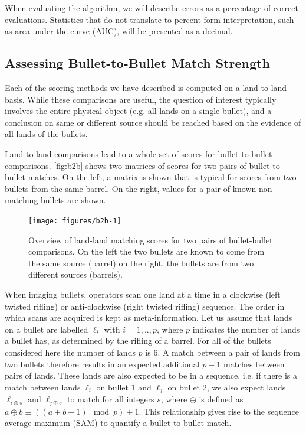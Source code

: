 \documentclass[doubleblind]{elsarticle}\usepackage[]{graphicx}\usepackage[]{color}
\newenvironment{knitrout}{}{} %
\begin{document}
When evaluating the \citet{aoas2} algorithm, we will describe errors as a percentage of correct evaluations. Statistics that do not translate to percent-form interpretation, such as area under the curve (AUC), will be presented as a decimal. 

\subsection{Assessing Bullet-to-Bullet Match Strength}

Each of the scoring methods we have described is computed on a land-to-land basis. While these comparisons are useful, the question of interest typically involves the entire physical object (e.g. all lands on a single bullet), and a conclusion on same or different source should be reached based on the evidence of all lands of the bullets.



Land-to-land comparisons lead to a whole set of scores for bullet-to-bullet comparisons. \autoref{fig:b2b} shows two matrices of scores for two pairs of bullet-to-bullet matches. On the left, a matrix is shown that is typical for scores from two bullets from the same barrel. On the right, values for a pair of known non-matching bullets are shown.


\begin{knitrout}
\color{fgcolor}\begin{figure}

{\centering \texttt{[image: figures/b2b-1]} 

}

\caption[Overview of land-land matching scores for two pairs of bullet-bullet comparisons]{Overview of land-land matching scores for two pairs of bullet-bullet comparisons. On the left the two bullets are known to come from the same source (barrel) on the right, the bullets are from two different sources (barrels).}\label{fig:b2b}
\end{figure}


\end{knitrout}

When imaging bullets, operators scan one land at a time in a clockwise (left twisted rifling) or anti-clockwise (right twisted rifling) sequence. The order in which scans are acquired is kept as meta-information. Let us assume that lands on a bullet are labelled $\ell_i$ with $i = 1, .., p$, where $p$ indicates the number of lands a bullet has, as determined by the rifling of a barrel. For all of the bullets considered here the number of lands $p$ is 6. A match between  a pair of lands from two bullets therefore results in an expected additional $p-1$ matches between pairs of lands. These lands are also expected to be in a sequence, i.e. if there is a match between lands $\ell_i$ on bullet 1 and $\ell_j$ on bullet 2, we also expect lands $\ell_{i\oplus s}$ and $\ell_{j\oplus s}$ to match for all integers $s$, where $\oplus$ is defined as $a \oplus b \equiv \left((a + b - 1)\mod p\right) + 1$. This relationship gives rise to the sequence average maximum (SAM) to quantify a bullet-to-bullet match. 
\end{document}
